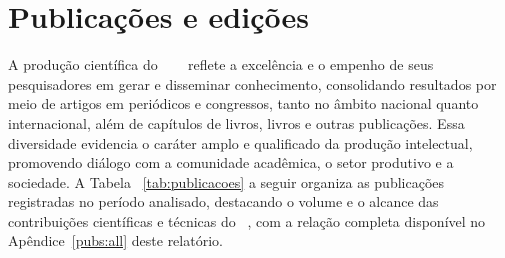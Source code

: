 \section{Publicações e edições}

A produção científica do ~\modProjeto ~\meuTitulo ~ reflete a excelência e o empenho de seus pesquisadores em gerar e disseminar conhecimento, consolidando resultados por meio de artigos em periódicos e congressos, tanto no âmbito nacional quanto internacional, além de capítulos de livros, livros e outras publicações. Essa diversidade evidencia o caráter amplo e qualificado da produção intelectual, promovendo diálogo com a comunidade acadêmica, o setor produtivo e a sociedade. A Tabela ~\ref{tab:publicacoes} a seguir organiza as publicações registradas no período analisado, destacando o volume e o alcance das contribuições científicas e técnicas do ~\meuTitulo, com a relação completa disponível no Apêndice~\ref{pubs:all} deste relatório.


\begin{comment}
\textbf{Resumo:}\\
Artigos no .bib: \thearticount, citados: \thearticitedcount \\
Artigos Nacionais: \theartncount, citados: \theartncitedcount \\
Proceedings Internacionais: \theprocicount, citados: \theprocicitedcount \\
Proceedings Nacionais: \theprocncount, citados: \theprocncitedcount \\
Submissões: \thesubcount, citados: \thesubcitedcount \\
Livros: \thebookcount, citados: \thebookcitedcount \\
Capítulos: \thecapcount, citados: \thecapcitedcount \\
Outros: \theotherscount, citados: \theotherscitedcount
\end{comment}


